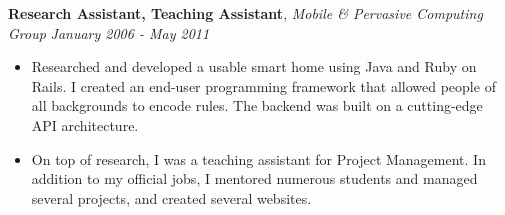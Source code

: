 \documentclass[9pt]{article}
\newenvironment{changemargin}[2]{%
  \begin{list}{}{%
    \setlength{\topsep}{0pt}%
    \setlength{\leftmargin}{#1}%
    \setlength{\rightmargin}{#2}%
    \setlength{\listparindent}{\parindent}%
    \setlength{\itemindent}{\parindent}%
    \setlength{\parsep}{\parskip}%
  }%
  \item[]}{\end{list}
}
\newcommand{\jobdescription}[1]{
	\begin{changemargin}{0.15in}{0.15in}
    \smallskip
		{#1}
    \medskip
	\end{changemargin}
}
\newcommand{\jobtitle}[3]{
	\textbf{#1}, \emph{#2} \hfill \emph{#3}\\
}
\newenvironment{body} {
	\vspace*{-16pt}
	\begin{changemargin}{-0.25in}{-0.5in}
  }	
	{\end{changemargin}
}
\begin{document}
\begin{body}
	\jobtitle{Research Assistant, Teaching Assistant}{Mobile \& Pervasive Computing Group}{January 2006 - May 2011}
  \jobdescription {
  	\begin{itemize} \itemsep -0pt  %
      \item Researched and developed a usable smart home using Java and Ruby on Rails. I created an end-user programming framework that allowed people of all backgrounds to encode rules. The backend was built on a cutting-edge API architecture. 
      \item On top of research, I was a teaching assistant for Project Management. In addition to my official jobs, I mentored numerous students and managed several projects, and created several websites.
  	\end{itemize}
  }




\end{body}
\end{document}
